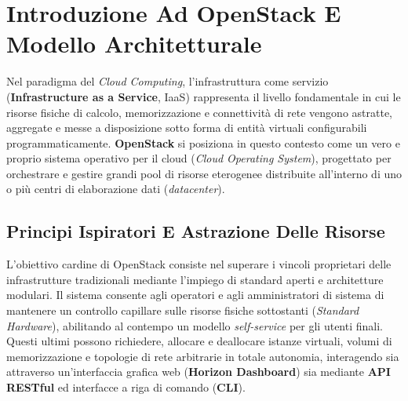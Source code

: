 \documentclass[11pt, a4paper]{article}
\begin{document}


\section{Introduzione Ad OpenStack E Modello Architetturale}

Nel paradigma del \emph{Cloud Computing}, l'infrastruttura come servizio (\textbf{Infrastructure as a Service}, IaaS) rappresenta il livello fondamentale in cui le risorse fisiche di calcolo, memorizzazione e connettività di rete vengono astratte, aggregate e messe a disposizione sotto forma di entità virtuali configurabili programmaticamente. \textbf{OpenStack} si posiziona in questo contesto come un vero e proprio sistema operativo per il cloud (\emph{Cloud Operating System}), progettato per orchestrare e gestire grandi pool di risorse eterogenee distribuite all'interno di uno o più centri di elaborazione dati (\emph{datacenter}).

\subsection{Principi Ispiratori E Astrazione Delle Risorse}

L'obiettivo cardine di OpenStack consiste nel superare i vincoli proprietari delle infrastrutture tradizionali mediante l'impiego di standard aperti e architetture modulari. Il sistema consente agli operatori e agli amministratori di sistema di mantenere un controllo capillare sulle risorse fisiche sottostanti (\emph{Standard Hardware}), abilitando al contempo un modello \emph{self-service} per gli utenti finali. Questi ultimi possono richiedere, allocare e deallocare istanze virtuali, volumi di memorizzazione e topologie di rete arbitrarie in totale autonomia, interagendo sia attraverso un'interfaccia grafica web (\textbf{Horizon Dashboard}) sia mediante \textbf{API RESTful} ed interfacce a riga di comando (\textbf{CLI}).

\end{document}
